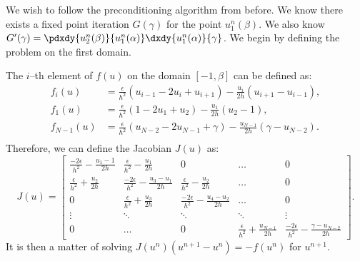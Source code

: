 \documentclass{book}
\begin{document}
We wish to follow the preconditioning algorithm from before.
We know there exists a fixed point iteration $G(\gamma)$ for the point $u^n_1(\beta)$.
We also know $G'(\gamma) = \pdxdy{u^n_2(\beta)}{u^n_1(\alpha)} \dxdy{u^n_1(\alpha)}{\gamma}$.
We begin by defining the problem on the first domain.

The $i$--th element of $f(u)$ on the domain $[-1,\beta]$ can be defined as:
\begin{align*}
f_i(u) & = \frac{\epsilon}{h^2} \left ( u_{i-1} - 2 u_i + u_{i+1} \right )
- \frac{u_i}{2h} \left ( u_{i+1} - u_{i-1} \right ) , \\
f_1(u) & = \frac{\epsilon}{h^2} \left ( 1 - 2 u_1 + u_2 \right )
- \frac{u_1}{2h} \left ( u_2 - 1 \right ) , \\
f_{N-1}(u) & = \frac{\epsilon}{h^2} \left ( u_{N-2} - 2 u_{N-1} + \gamma \right )
- \frac{u_{N-1}}{2h} \left ( \gamma - u_{N-2} \right ) . \\
\end{align*}
Therefore, we can define the Jacobian $J(u)$ as:
\begin{equation*}
J(u) = \begin{bmatrix} \frac{-2\epsilon}{h^2} - \frac{u_1 - 1}{2h} & \frac{\epsilon}{h^2} - \frac{u_1}{2h} & 0 & \dots & 0 \\
\frac{\epsilon}{h^2} + \frac{u_2}{2h} & \frac{-2\epsilon}{h^2} - \frac{u_3 - u_1}{2h} & \frac{\epsilon}{h^2} - \frac{u_2}{2h} & \dots & 0 \\
0 & \frac{\epsilon}{h^2} + \frac{u_3}{2h} & \frac{-2\epsilon}{h^2} - \frac{u_4 - u_2}{2h} & \dots & 0 \\
\vdots & \ddots & \ddots & \ddots & \vdots \\
0 & \dots & 0 & \frac{\epsilon}{h^2} + \frac{u_{N-1}}{2h} & \frac{-2\epsilon}{h^2} - \frac{\gamma - u_{N-2}}{2h} \end{bmatrix} .
\end{equation*}
It is then a matter of solving $J(u^n) (u^{n+1} - u^n) = -f(u^n)$ for $u^{n+1}$.
\end{document}
